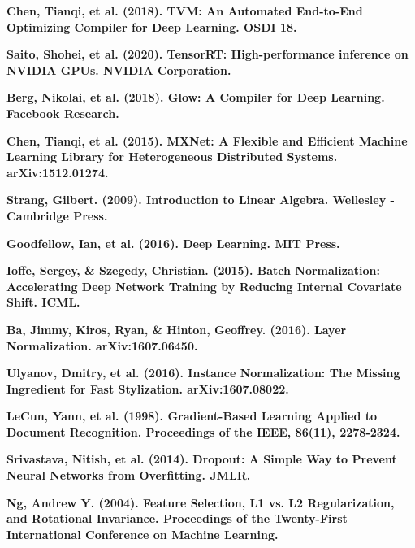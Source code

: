 \documentclass[sigconf]{acmart}
\begin{document}
\textbf{Chen, Tianqi, et al. (2018). TVM: An Automated End-to-End Optimizing Compiler for Deep Learning. OSDI 18.} \vspace{3mm}

\textbf{Saito, Shohei, et al. (2020). TensorRT: High-performance inference on NVIDIA GPUs. NVIDIA Corporation.} \vspace{3mm}

\textbf{Berg, Nikolai, et al. (2018). Glow: A Compiler for Deep Learning. Facebook Research.} \vspace{3mm}

\textbf{Chen, Tianqi, et al. (2015). MXNet: A Flexible and Efficient Machine Learning Library for Heterogeneous Distributed Systems. arXiv:1512.01274.} \vspace{3mm}

\textbf{Strang, Gilbert. (2009). Introduction to Linear Algebra. Wellesley
-Cambridge Press.} \vspace{3mm}

\textbf{Goodfellow, Ian, et al. (2016). Deep Learning. MIT Press.} \vspace{3mm}

\textbf{Ioffe, Sergey, \& Szegedy, Christian. (2015). Batch Normalization: Accelerating Deep Network Training by Reducing Internal Covariate Shift. ICML.} \vspace{3mm}

\textbf{Ba, Jimmy, Kiros, Ryan, \& Hinton, Geoffrey. (2016). Layer Normalization. arXiv:1607.06450.} \vspace{3mm}

\textbf{Ulyanov, Dmitry, et al. (2016). Instance Normalization: The Missing Ingredient for Fast Stylization. arXiv:1607.08022.}\vspace{3mm}

\textbf{LeCun, Yann, et al. (1998). Gradient-Based Learning Applied to Document Recognition. Proceedings of the IEEE, 86(11), 2278-2324.} \vspace{3mm}

\textbf{Srivastava, Nitish, et al. (2014). Dropout: A Simple Way to Prevent Neural Networks from Overfitting. JMLR.} \vspace{3mm}

\textbf{Ng, Andrew Y. (2004). Feature Selection, L1 vs. L2 Regularization, and Rotational Invariance. Proceedings of the Twenty-First International Conference on Machine Learning.} \vspace{3mm}
\end{document}
